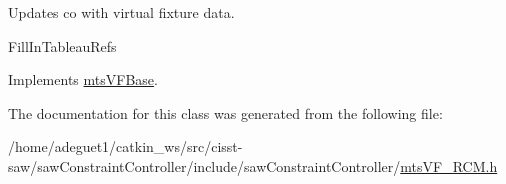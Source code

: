 Updates co with virtual fixture data. 

Fill\-In\-Tableau\-Refs 

Implements \hyperlink{classmts_v_f_base_aef5a28675f79945766a2b114c957ae6f}{mts\-V\-F\-Base}.



The documentation for this class was generated from the following file\-:\begin{DoxyCompactItemize}
\item 
/home/adeguet1/catkin\-\_\-ws/src/cisst-\/saw/saw\-Constraint\-Controller/include/saw\-Constraint\-Controller/\hyperlink{mts_v_f___r_c_m_8h}{mts\-V\-F\-\_\-\-R\-C\-M.\-h}\end{DoxyCompactItemize}

